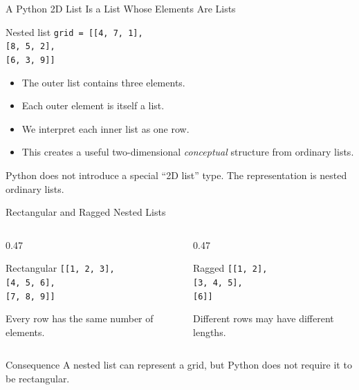 \documentclass[aspectratio=169,10pt]{beamer}
\begin{document}
\begin{frame}{A Python 2D List Is a List Whose Elements Are Lists}
  \begin{block}{Nested list}
    \texttt{grid = [[4, 7, 1],}\\
    \hspace*{0.78in}\texttt{[8, 5, 2],}\\
    \hspace*{0.78in}\texttt{[6, 3, 9]]}
  \end{block}

  \begin{itemize}
    \item The outer list contains three elements.
    \item Each outer element is itself a list.
    \item We interpret each inner list as one row.
    \item This creates a useful two-dimensional \emph{conceptual} structure from ordinary lists.
  \end{itemize}

  \begin{keyidea}
    Python does not introduce a special ``2D list'' type. The representation is nested ordinary lists.
  \end{keyidea}
\end{frame}

\begin{frame}{Rectangular and Ragged Nested Lists}
  \begin{columns}[T,onlytextwidth]
    \begin{column}{0.47\textwidth}
      \begin{block}{Rectangular}
        \texttt{[[1, 2, 3],}\\
        \hspace*{0.16in}\texttt{[4, 5, 6],}\\
        \hspace*{0.16in}\texttt{[7, 8, 9]]}
      \end{block}
      Every row has the same number of elements.
    \end{column}
    \begin{column}{0.47\textwidth}
      \begin{block}{Ragged}
        \texttt{[[1, 2],}\\
        \hspace*{0.16in}\texttt{[3, 4, 5],}\\
        \hspace*{0.16in}\texttt{[6]]}
      \end{block}
      Different rows may have different lengths.
    \end{column}
  \end{columns}

  \begin{alertblock}{Consequence}
    A nested list can represent a grid, but Python does not require it to be rectangular.
  \end{alertblock}
\end{frame}
\end{document}
